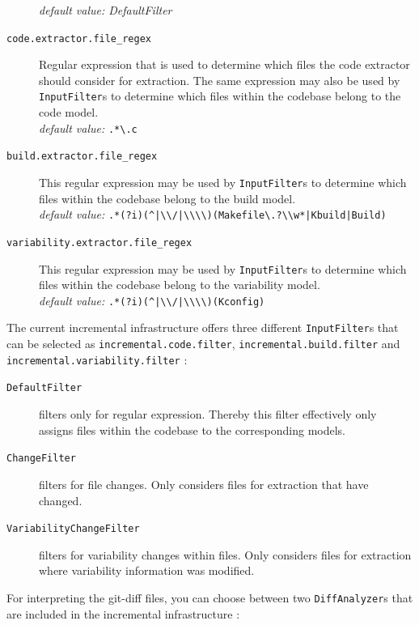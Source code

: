 \documentclass[a4paper]{article}
\begin{document}
\begin{description}
	    \emph{default value: DefaultFilter}
	\item[\texttt{code.extractor.file\_regex}] Regular expression that is used to determine which files the code extractor should consider for extraction. The same expression may also be used by \texttt{InputFilter}s to determine which files within the codebase belong to the code model. \\
	    \emph{default value:} \lstinline[columns=fixed]{.*\.c}
	\item[\texttt{build.extractor.file\_regex}] This regular expression may be used by \texttt{Input\-Filter}s to determine which files within the codebase belong to the build model. \\
	    \emph{default value:} \lstinline[columns=fixed]{.*(?i)(^|\\/|\\\\)(Makefile\.?\\w*|Kbuild|Build)}
	\item[\texttt{variability.extractor.file\_regex}] This regular expression may be used by \texttt{InputFilter}s to determine which files within the codebase belong to the variability model.  \\
	\emph{default value:} \lstinline[columns=fixed]{.*(?i)(^|\\/|\\\\)(Kconfig)}
\end{description}

The current incremental infrastructure offers three different \texttt{InputFilter}s that can be selected as \texttt{incremental.code.filter}, \texttt{incremental.build.filter} and \texttt{incremental.variability.filter} :

\begin{description}
	\item[\texttt{DefaultFilter}] filters only for regular expression. Thereby this filter effectively only assigns files within the codebase to the corresponding models.
	\item[\texttt{ChangeFilter}] filters for file changes. Only considers files for extraction that have changed.
	\item[\texttt{VariabilityChangeFilter}] filters for variability changes within files. Only considers files for extraction where variability information was modified.
\end{description}

For interpreting the git-diff files, you can choose between two \texttt{DiffAnalyzer}s that are included in the incremental infrastructure :
\end{document}

